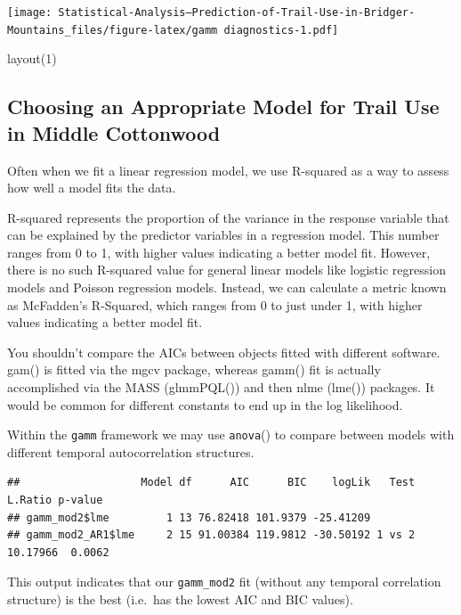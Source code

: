 \documentclass[
]{book}
\newenvironment{Shaded}{\begin{snugshade}}{\end{snugshade}}
\newcommand{\DecValTok}[1]{\textcolor[rgb]{0.00,0.00,0.81}{#1}}
\newcommand{\FunctionTok}[1]{\textcolor[rgb]{0.00,0.00,0.00}{#1}}
\newcommand{\NormalTok}[1]{#1}
\begin{document}
\texttt{[image: Statistical-Analysis--Prediction-of-Trail-Use-in-Bridger-Mountains\_files/figure-latex/gamm diagnostics-1.pdf]}

\begin{Shaded}
\begin{Highlighting}[]
\FunctionTok{layout}\NormalTok{(}\DecValTok{1}\NormalTok{)}
\end{Highlighting}
\end{Shaded}

\hypertarget{choosing-an-appropriate-model-for-trail-use-in-middle-cottonwood}{%
\subsection{Choosing an Appropriate Model for Trail Use in Middle Cottonwood}\label{choosing-an-appropriate-model-for-trail-use-in-middle-cottonwood}}

Often when we fit a linear regression model, we use R-squared as a way to assess how well a model fits the data.

R-squared represents the proportion of the variance in the response variable that can be explained by the predictor variables in a regression model. This number ranges from 0 to 1, with higher values indicating a better model fit. However, there is no such R-squared value for general linear models like logistic regression models and Poisson regression models. Instead, we can calculate a metric known as McFadden's R-Squared, which ranges from 0 to just under 1, with higher values indicating a better model fit.

You shouldn't compare the AICs between objects fitted with different software. gam() is fitted via the mgcv package, whereas gamm() fit is actually accomplished via the MASS (glmmPQL()) and then nlme (lme()) packages. It would be common for different constants to end up in the log likelihood.

Within the \texttt{gamm} framework we may use \texttt{anova}() to compare between models with different temporal autocorrelation structures.

\begin{verbatim}
##                   Model df      AIC      BIC    logLik   Test  L.Ratio p-value
## gamm_mod2$lme         1 13 76.82418 101.9379 -25.41209                        
## gamm_mod2_AR1$lme     2 15 91.00384 119.9812 -30.50192 1 vs 2 10.17966  0.0062
\end{verbatim}

This output indicates that our \texttt{gamm\_mod2} fit (without any temporal correlation structure) is the best (i.e.~has the lowest AIC and BIC values).
\end{document}
